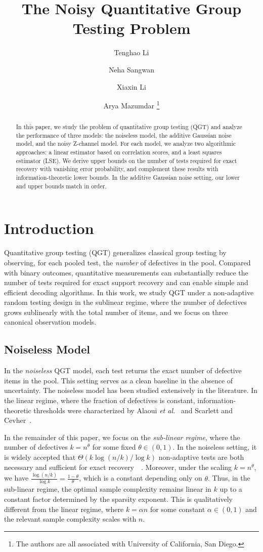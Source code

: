 \documentclass{article}
\title{The Noisy Quantitative Group Testing Problem}
\author{Tenghao Li \and Neha Sangwan \and Xiaxin Li \and Arya Mazumdar
\thanks{The authors are all associated with University of California, San Diego. 
}}
\date{}
\begin{document}
\maketitle
\begin{abstract}
In this paper, we study the problem of quantitative group testing (QGT) and analyze the performance of three models: the noiseless model, the additive Gaussian noise model, and the noisy Z-channel model.
For each model, we analyze two algorithmic approaches: a linear estimator based on correlation scores, and a least squares estimator (LSE).
We derive upper bounds on the number of tests required for exact recovery with vanishing error probability, and complement these results with information-theoretic lower bounds.
In the additive Gaussian noise setting, our lower and upper bounds match in order.
\end{abstract}

\section{Introduction}
Quantitative group testing (QGT)\cite{feige_quantitative_2020}\cite{karimi2019} generalizes classical group testing by observing, for each pooled test, the \emph{number} of defectives in the pool.
Compared with binary outcomes, quantitative measurements can substantially reduce the number of tests required for exact support recovery and can enable simple and efficient decoding algorithms.
In this work, we study QGT under a non-adaptive random testing design in the sublinear regime, where the number of defectives grows sublinearly with the total number of items, and we focus on three canonical observation models.
\subsection{Noiseless Model}
In the \emph{noiseless} QGT model, each test returns the exact number of defective items in the pool. This setting serves as a clean baseline in the absence of uncertainty. The noiseless model has been studied extensively in the literature\cite{alaoui2014}\cite{hahn-klimroth_efficient_2023}\cite{karimi_sparse_2019}. In the linear regime, where the fraction of defectives is constant, information-theoretic thresholds were characterized by Alaoui \emph{et al.}~\cite{alaoui2014} and Scarlett and Cevher~\cite{scarlett2017phase}. 

In the remainder of this paper, we focus on the \emph{sub-linear regime}, where the number of defectives $k=n^\theta$ for some fixed $\theta\in(0,1)$.  In the noiseless setting, it is widely accepted that $\Theta(k\log(n/k)/\log k)$ non-adaptive tests are both necessary and sufficient for exact recovery~\cite{djackov1975}~\cite{hahn-klimroth_near_2022}. Moreover, under the scaling $k=n^\theta$, we have
$\frac{\log(n/k)}{\log k}=\frac{1-\theta}{\theta}$,
which is a constant depending only on $\theta$. Thus, in the sub-linear regime, the optimal sample complexity remains linear in $k$ up to a constant factor determined by the sparsity exponent. This is qualitatively different from the linear regime, where $k=\alpha n$ for some constant $\alpha\in(0,1)$ and the relevant sample complexity scales with $n$.
\end{document}
